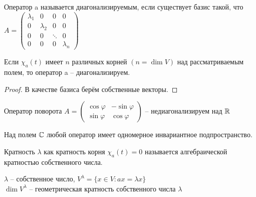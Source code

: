\begin{Def} 
	Оператор a называется диагонализируемым, если существует базис такой, что $A = \left(\begin{array}{cccc}
		\lambda_1 & 0 & 0 & 0\\
		0 & \lambda_2 & 0 & 0\\
		0 & 0 & \ddots & 0\\
		0 & 0 & 0 & \lambda_n
	\end{array}
	\right)$
\end{Def} 

\begin{Thm} 
	Если $\chi_a(t)$ имеет $n$ различных корней $(n = \dim V)$ над рассматриваемым полем, то оператор a -- диагонализируем. 
\end{Thm} 

\begin{proof}
	В качестве базиса берём собственные векторы. 
\end{proof}

\begin{Example}
	Оператор поворота $A = \left(\begin{array}{cc}
		\cos \varphi & - \sin \varphi\\
		\sin \varphi & \cos \varphi
	\end{array}\right)$ -- недиагонализируем над $\mathbb{R}$
\end{Example}

\begin{Lm}
	Над полем $\mathbb{C}$ любой оператор имеет одномерное инвариантное подпространство.
\end{Lm}

\begin{Def} 
	Кратность $\lambda$ как кратность корня $\chi_a (t) = 0$ называется алгебраической кратностью собственного числа. 
\end{Def} 

\begin{Def}
	$\lambda$ -- собственное число, $V^{\lambda} = \{x \in V: ax = \lambda x\}$\\
	$\dim V^{\lambda}$ -- геометрическая кратность собственного числа $\lambda$
\end{Def}

